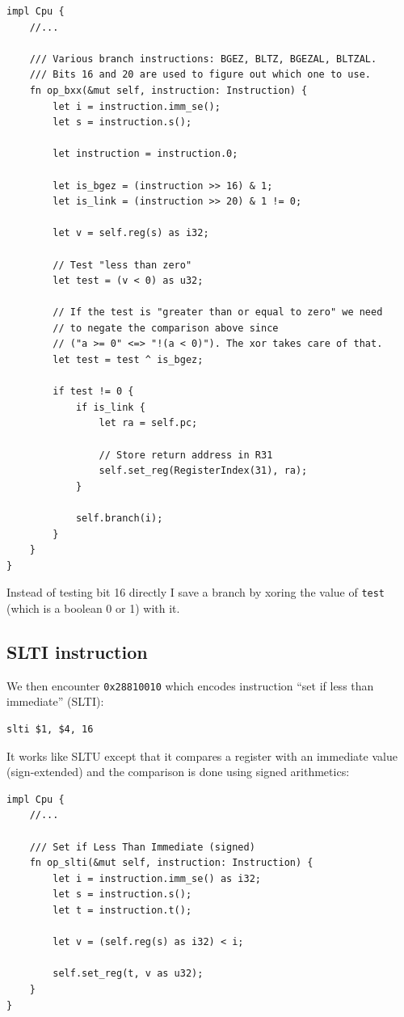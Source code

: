 \documentclass[a4paper]{article}
\newcommand{\code}[1] {\texttt{#1}}
\begin{document}
\begin{lstlisting}
impl Cpu {
    //...

    /// Various branch instructions: BGEZ, BLTZ, BGEZAL, BLTZAL.
    /// Bits 16 and 20 are used to figure out which one to use.
    fn op_bxx(&mut self, instruction: Instruction) {
        let i = instruction.imm_se();
        let s = instruction.s();

        let instruction = instruction.0;

        let is_bgez = (instruction >> 16) & 1;
        let is_link = (instruction >> 20) & 1 != 0;

        let v = self.reg(s) as i32;

        // Test "less than zero"
        let test = (v < 0) as u32;

        // If the test is "greater than or equal to zero" we need
        // to negate the comparison above since
        // ("a >= 0" <=> "!(a < 0)"). The xor takes care of that.
        let test = test ^ is_bgez;

        if test != 0 {
            if is_link {
                let ra = self.pc;

                // Store return address in R31
                self.set_reg(RegisterIndex(31), ra);
            }

            self.branch(i);
        }
    }
}
\end{lstlisting}

Instead of testing bit 16 directly I save a branch by xoring the value
of \code{test} (which is a boolean 0 or 1) with it.

\subsection{SLTI instruction}

We then encounter \code{0x28810010} which encodes instruction ``set if
less than immediate'' (SLTI):

\begin{lstlisting}[language=assembly]
slti $1, $4, 16
\end{lstlisting}

It works like SLTU except that it compares a register with an
immediate value (sign-extended) and the comparison is done using
signed arithmetics:

\begin{lstlisting}
impl Cpu {
    //...

    /// Set if Less Than Immediate (signed)
    fn op_slti(&mut self, instruction: Instruction) {
        let i = instruction.imm_se() as i32;
        let s = instruction.s();
        let t = instruction.t();

        let v = (self.reg(s) as i32) < i;

        self.set_reg(t, v as u32);
    }
}
\end{lstlisting}
\end{document}
